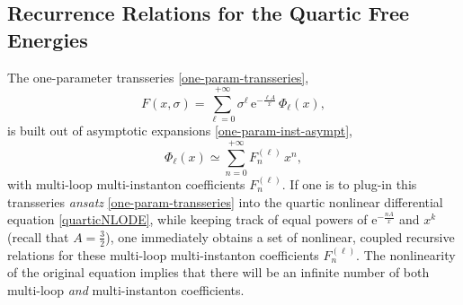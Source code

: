 \documentclass[11pt,a4paper]{article}
\newcommand{\be}{\begin{equation}}
\newcommand{\ee}{\end{equation}}
\newcommand{\rme}{{\mathrm{e}}}
\begin{document}
\subsection*{Recurrence Relations for the Quartic Free Energies}

The one-parameter transseries \eqref{one-param-transseries},
%
\be
F (x, \sigma) = \sum_{\ell=0}^{+\infty} \sigma^\ell\, \rme^{-\frac{\ell A}{x}}\, \Phi_{\ell} (x),
\ee
%
\noindent
is built out of asymptotic expansions \eqref{one-param-inst-asympt},
%
\be
\Phi_{\ell} (x) \simeq \sum_{n=0}^{+\infty} F_n^{(\ell)}\, x^n,
\ee
%
\noindent
with multi-loop multi-instanton coefficients $F_n^{(\ell)}$. If one is to plug-in this transseries \textit{ansatz} \eqref{one-param-transseries} into the quartic nonlinear differential equation \eqref{quarticNLODE}, while keeping track of equal powers of  $\rme^{-\frac{n A}{x}}$ and $x^{k}$ (recall that $A=\frac{3}{2}$), one immediately obtains a set of nonlinear, coupled recursive relations for these multi-loop multi-instanton coefficients $F_n^{(\ell)}$. The nonlinearity of the original equation implies that there will be an infinite number of both multi-loop \textit{and} multi-instanton coefficients.
\end{document}
